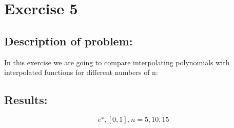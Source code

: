 \documentclass{article}
\begin{document}
\section*{Exercise 5}
\subsection*{Description of problem:}
In this exercise we are going to compare interpolating polynomials with interpolated functions for different numbers of n:

\newpage

\subsection*{Results:}

\[
    e^x, [0, 1], n = 5, 10, 15
\]
\end{document}

